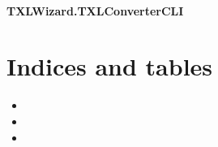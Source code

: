 \documentclass[letterpaper,10pt,english]{sphinxmanual}
\begin{document}
\subsubsection{TXLWizard.TXLConverterCLI}
\label{Chapters/PythonModuleReference/TXLConverter/TXLWizard.TXLConverterCLI::doc}\label{Chapters/PythonModuleReference/TXLConverter/TXLWizard.TXLConverterCLI:txlwizard-txlconvertercli}

\chapter{Indices and tables}
\label{index:indices-and-tables}\begin{itemize}
\item {} 

\item {} 

\item {} 

\end{itemize}
\end{document}

